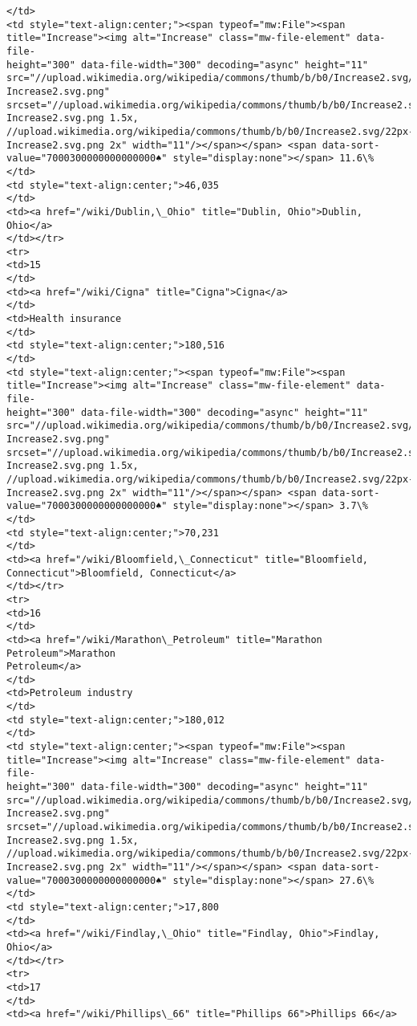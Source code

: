 \documentclass[11pt]{article}
\begin{document}
\begin{Verbatim}[commandchars=\\\{\}]
</td>
<td style="text-align:center;"><span typeof="mw:File"><span
title="Increase"><img alt="Increase" class="mw-file-element" data-file-
height="300" data-file-width="300" decoding="async" height="11"
src="//upload.wikimedia.org/wikipedia/commons/thumb/b/b0/Increase2.svg/11px-
Increase2.svg.png"
srcset="//upload.wikimedia.org/wikipedia/commons/thumb/b/b0/Increase2.svg/17px-
Increase2.svg.png 1.5x,
//upload.wikimedia.org/wikipedia/commons/thumb/b/b0/Increase2.svg/22px-
Increase2.svg.png 2x" width="11"/></span></span> <span data-sort-
value="7000300000000000000♠" style="display:none"></span> 11.6\%
</td>
<td style="text-align:center;">46,035
</td>
<td><a href="/wiki/Dublin,\_Ohio" title="Dublin, Ohio">Dublin, Ohio</a>
</td></tr>
<tr>
<td>15
</td>
<td><a href="/wiki/Cigna" title="Cigna">Cigna</a>
</td>
<td>Health insurance
</td>
<td style="text-align:center;">180,516
</td>
<td style="text-align:center;"><span typeof="mw:File"><span
title="Increase"><img alt="Increase" class="mw-file-element" data-file-
height="300" data-file-width="300" decoding="async" height="11"
src="//upload.wikimedia.org/wikipedia/commons/thumb/b/b0/Increase2.svg/11px-
Increase2.svg.png"
srcset="//upload.wikimedia.org/wikipedia/commons/thumb/b/b0/Increase2.svg/17px-
Increase2.svg.png 1.5x,
//upload.wikimedia.org/wikipedia/commons/thumb/b/b0/Increase2.svg/22px-
Increase2.svg.png 2x" width="11"/></span></span> <span data-sort-
value="7000300000000000000♠" style="display:none"></span> 3.7\%
</td>
<td style="text-align:center;">70,231
</td>
<td><a href="/wiki/Bloomfield,\_Connecticut" title="Bloomfield,
Connecticut">Bloomfield, Connecticut</a>
</td></tr>
<tr>
<td>16
</td>
<td><a href="/wiki/Marathon\_Petroleum" title="Marathon Petroleum">Marathon
Petroleum</a>
</td>
<td>Petroleum industry
</td>
<td style="text-align:center;">180,012
</td>
<td style="text-align:center;"><span typeof="mw:File"><span
title="Increase"><img alt="Increase" class="mw-file-element" data-file-
height="300" data-file-width="300" decoding="async" height="11"
src="//upload.wikimedia.org/wikipedia/commons/thumb/b/b0/Increase2.svg/11px-
Increase2.svg.png"
srcset="//upload.wikimedia.org/wikipedia/commons/thumb/b/b0/Increase2.svg/17px-
Increase2.svg.png 1.5x,
//upload.wikimedia.org/wikipedia/commons/thumb/b/b0/Increase2.svg/22px-
Increase2.svg.png 2x" width="11"/></span></span> <span data-sort-
value="7000300000000000000♠" style="display:none"></span> 27.6\%
</td>
<td style="text-align:center;">17,800
</td>
<td><a href="/wiki/Findlay,\_Ohio" title="Findlay, Ohio">Findlay, Ohio</a>
</td></tr>
<tr>
<td>17
</td>
<td><a href="/wiki/Phillips\_66" title="Phillips 66">Phillips 66</a>

\end{Verbatim}
\end{document}
